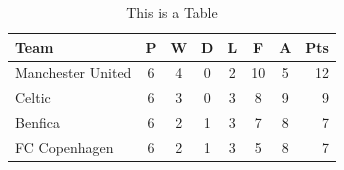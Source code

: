 \begin{table}
\centering
\begin{tabular}{l*{6}{c}r}
Team              & P & W & D & L & F  & A & Pts \\
\hline
Manchester United & 6 & 4 & 0 & 2 & 10 & 5 & 12  \\
Celtic            & 6 & 3 & 0 & 3 &  8 & 9 &  9  \\
Benfica           & 6 & 2 & 1 & 3 &  7 & 8 &  7  \\
FC Copenhagen     & 6 & 2 & 1 & 3 &  5 & 8 &  7  \\
\end{tabular}
\caption{This is a Table}
\label{tab1}
\end{table}